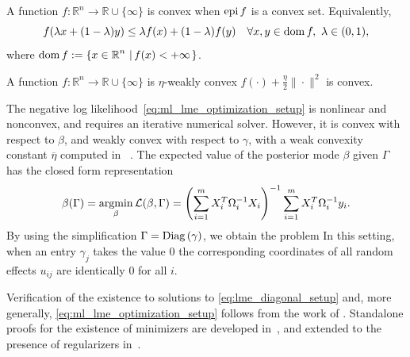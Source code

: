 \begin{definition}[Convexity]
A function $f:\mathbb{R}^n\rightarrow \mathbb{R} \cup \{\infty\}$ is convex when $\operatorname{epi} f$ is a convex set. Equivalently, 
\[
f(\lambda x + (1-\lambda)y) \leq \lambda f(x) + (1-\lambda) f(y) \quad \forall x,y\in\operatorname{\mathrm{dom}}{f},\ \lambda \in (0,1),
\]
where $\operatorname{\mathrm{dom}}{f}:=\left\{x\in{\operatorname{\mathbb{R}}^n}\,\left|\,f(x)<+\infty\right.\right\}$.
\end{definition}

\begin{definition}
A function $f:\mathbb{R}^n\rightarrow \mathbb{R} \cup \{\infty\}$ is $\eta$-weakly convex 
$f(\cdot)+\frac{\eta}{2}\|\cdot\|^2$ is convex. 
\end{definition}

The negative log likelihood~\eqref{eq:ml_lme_optimization_setup}  is nonlinear and nonconvex, and requires an iterative numerical solver.
However, it is convex with respect to $\beta$, and weakly convex with respect to $\gamma$, with a weak convexity constant $\overline \eta$
computed in~\cite[Section 5.1]{Theory1} . The expected value of the posterior mode $\beta$ given $\Gamma$ has the closed form representation 
\[
	\beta(\Gamma) = \operatorname*{\mathrm{argmin}}_{\beta}\operatorname{\mathcal{L}}(\beta, \Gamma) = \left(\sum_{i = 1}^m X_i^T\Omega_i^{-1}X_i\right)^{-1}\sum_{i = 1}^mX_i^T\Omega_i^{-1}y_i.
\] %
By using the simplification $\Gamma=\mathrm{Diag}\left(\gamma\right)$, we obtain the problem
In this setting, when an
entry $\gamma_j$ takes the  value $0$ the corresponding coordinates of all random effects $u_{ij}$ are identically $0$ for all $i$. 

Verification of the existence to solutions to \eqref{eq:lme_diagonal_setup}
and, more generally, \eqref{eq:ml_lme_optimization_setup} follows from the work of \cite{zheng2021trimmed}.
Standalone proofs for the existence of minimizers are developed in~\cite[Theorem 1]{Theory1},
and extended to the presence of regularizers in~\cite[Theorem 2]{Theory1}. %


